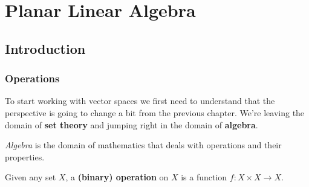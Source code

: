 \chapter{Planar Linear Algebra}
\section{Introduction}
\subsection{Operations}

To start working with vector spaces we first need to understand that the perspective is going to change a bit from the previous chapter. We're leaving the domain of \textbf{set theory} and jumping right in the domain of \textbf{algebra}.

\textit{Algebra }is the domain of mathematics that deals with operations and their properties.

\begin{df}
	Given any set $X$, a \textbf{(binary) operation} on $X$ is a function $f:X\times X \to X$.
\end{df}

